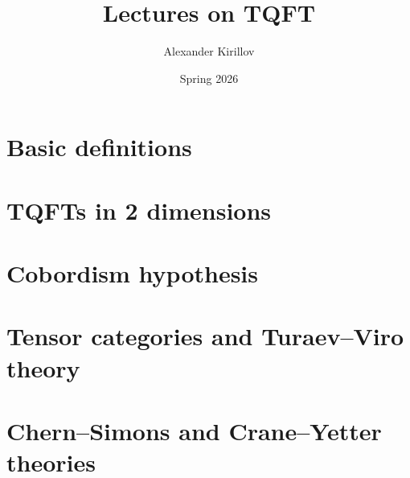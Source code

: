 \documentclass{amsbook}
\numberwithin{equation}{section}
\numberwithin{table}{section}
\numberwithin{figure}{section}
\begin{document}
\frontmatter
\title{Lectures on  TQFT}
\author{Alexander Kirillov}
\address{Department of Mathematics, Stony Brook University,
        Stony Brook, NY 11790}
\date{Spring 2026}
\maketitle
\tableofcontents



\mainmatter
\part{Basic definitions}




\part{TQFTs in 2 dimensions}











\part{Cobordism hypothesis}



\part{Tensor categories and Turaev--Viro theory}





\part{Chern--Simons and Crane--Yetter theories}


\backmatter
\printindex

\end{document}
